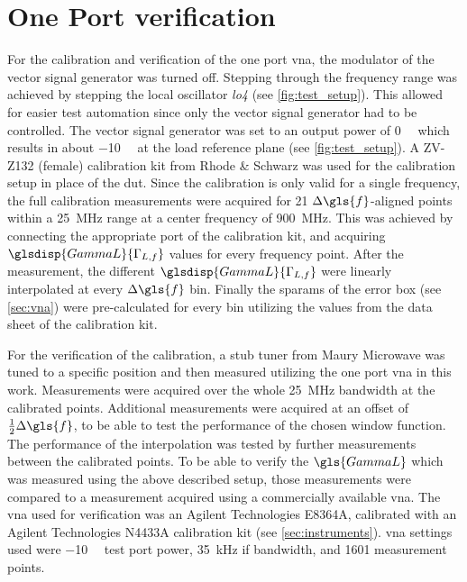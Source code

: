 \documentclass[12pt,a4paper,parskip=full,abstract=true,BCOR=12mm,twoside,open=right]{scrreprt}
\def\device#1{\mbox{\textit{#1}}}
\begin{document}

\section{One Port  verification}
\label{sec:vna_verify}

For the calibration and verification of the one port \gls{vna}, the modulator of
the vector signal generator was turned off. Stepping through the frequency range
was achieved by stepping the local oscillator \device{lo4} (see \cref{fig:test_setup}).
This allowed for easier test automation since only the vector signal generator had to
be controlled. The vector signal generator was set to an output power of \SI{0}{\deci\belm}
which results in about \SI{-10}{\deci\belm} at the load reference plane (see \cref{fig:test_setup}). A ZV-Z132 (female) calibration kit from Rhode \& Schwarz was used for the calibration
setup in place of the \gls{dut}. Since the calibration is only valid for a single frequency, the full
calibration measurements were acquired for 21 $\Delta{}\gls{f}$-aligned points within a
\SI{25}{\mega\hertz} range at a center frequency of \SI{900}{\mega\hertz}. This
was achieved by connecting the appropriate port of the calibration kit, and acquiring
$\glsdisp{GammaL}{\Gamma_{L,f}}$ values for every frequency point. After the measurement, the different $\glsdisp{GammaL}{\Gamma_{L,f}}$ were linearly
interpolated at every $\Delta{}\gls{f}$ bin. Finally the \glspl{sparam} of
the error box (see \cref{sec:vna}) were pre-calculated for every bin utilizing the values
from the data sheet of the calibration kit\cite{zv-z132}.

For the verification of the calibration, a stub tuner from Maury Microwave was tuned to a specific position and
then measured utilizing the one port \gls{vna} in this work. Measurements were acquired over
the whole \SI{25}{\mega\hertz} bandwidth at the calibrated points. Additional measurements
were acquired at an offset of $\frac{1}{2}\Delta{}\gls{f}$, to be able to test the performance
of the chosen window function. The performance of the interpolation was tested by further
measurements between the calibrated points. To be able to verify the $\gls{GammaL}$ which was measured using the
above described setup, those measurements were compared to a measurement acquired using a
commercially available \gls{vna}. The \gls{vna} used for verification was an Agilent Technologies E8364A,
calibrated with an Agilent Technologies N4433A calibration kit (see \cref{sec:instruments}). \gls{vna}
settings used were \SI{-10}{\deci\belm} test port power, \SI{35}{\kilo\hertz} \gls{if} bandwidth, and
1601 measurement points.
\end{document}
